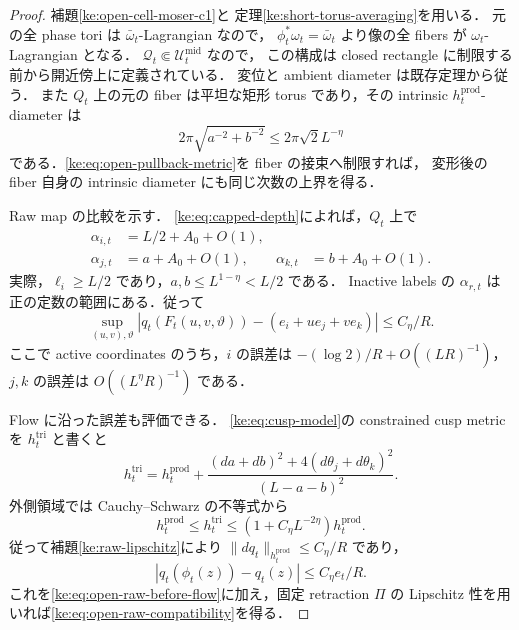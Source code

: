 \begin{proof}
補題\ref{ke:open-cell-moser-c1}と
定理\ref{ke:short-torus-averaging}を用いる．
元の全 phase tori は $\bar\omega_t$-Lagrangian なので，
$\phi_t^*\omega_t=\bar\omega_t$ より像の全 fibers が
$\omega_t$-Lagrangian となる．
$\mathcal Q_t\Subset\mathcal U_t^{\mathrm{mid}}$ なので，
この構成は closed rectangle に制限する前から開近傍上に定義されている．
変位と ambient diameter は既存定理から従う．
また $Q_t$ 上の元の fiber は平坦な矩形 torus であり，その intrinsic
$h_t^{\mathrm{prod}}$-diameter は
\[
 2\pi\sqrt{a^{-2}+b^{-2}}\le2\pi\sqrt2 L^{-\eta}
\]
である．\eqref{ke:eq:open-pullback-metric}を fiber の接束へ制限すれば，
変形後の fiber 自身の intrinsic diameter にも同じ次数の上界を得る．

Raw map の比較を示す．
\eqref{ke:eq:capped-depth}によれば，$Q_t$ 上で
\begin{align*}
 \alpha_{i,t}&=L/2+A_0+O(1),\\
 \alpha_{j,t}&=a+A_0+O(1),
 &\alpha_{k,t}&=b+A_0+O(1).
\end{align*}
実際，$\ell_i\ge L/2$ であり，$a,b\le L^{1-\eta}<L/2$ である．
Inactive labels の $\alpha_{r,t}$ は正の定数の範囲にある．従って
\begin{equation}\label{ke:eq:open-raw-before-flow}
 \sup_{(u,v),\vartheta}
 \left|q_t(F_t(u,v,\vartheta))-(e_i+u e_j+v e_k)\right|
 \le C_\eta/R.
\end{equation}
ここで active coordinates のうち，$i$ の誤差は
$-(\log2)/R+O((LR)^{-1})$，$j,k$ の誤差は $O((L^\eta R)^{-1})$ である．

Flow に沿った誤差も評価できる．
\eqref{ke:eq:cusp-model}の constrained cusp metric を $h_t^{\mathrm{tri}}$ と書くと
\[
 h_t^{\mathrm{tri}}
 =h_t^{\mathrm{prod}}
  +\frac{(da+db)^2+4(d\theta_j+d\theta_k)^2}{(L-a-b)^2}.
\]
外側領域では Cauchy--Schwarz の不等式から
\begin{equation}\label{ke:eq:open-two-models}
 h_t^{\mathrm{prod}}
 \le h_t^{\mathrm{tri}}
 \le(1+C_\eta L^{-2\eta})h_t^{\mathrm{prod}}.
\end{equation}
従って補題\ref{ke:raw-lipschitz}により
$\|dq_t\|_{h_t^{\mathrm{prod}}}\le C_\eta/R$ であり，
\[
 |q_t(\phi_t(z))-q_t(z)|\le C_\eta e_t/R.
\]
これを\eqref{ke:eq:open-raw-before-flow}に加え，固定 retraction $\Pi$ の
Lipschitz 性を用いれば\eqref{ke:eq:open-raw-compatibility}を得る．


\end{proof}
